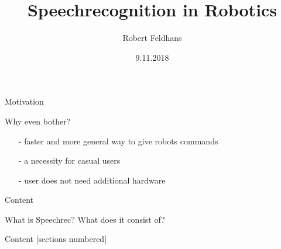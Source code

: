 \documentclass{beamer}
\title{Speechrecognition in Robotics}
\date{9.11.2018}
\author{Robert Feldhans}
\institute{Seminar Robocup}
\begin{document}
	\maketitle
	
	\begin{frame}{Motivation}
		\begin{alertblock}{Why even bother?}
			\begin{itemize}
				\item[-] faster and more general way to give robots commands
				\item[-] a necessity for casual users
				\item[-] user does not need additional hardware
			\end{itemize}
		\end{alertblock}
	\end{frame}
	
	\begin{frame}{Content}
		
		\begin{alertblock}{What is Speechrec? What does it consist of?}
		\end{alertblock}
		
	\end{frame}
	
	\begin{frame}{Content}
		[sections numbered]
		\tableofcontents[hideallsubsections]
	\end{frame}
	
\end{document}

